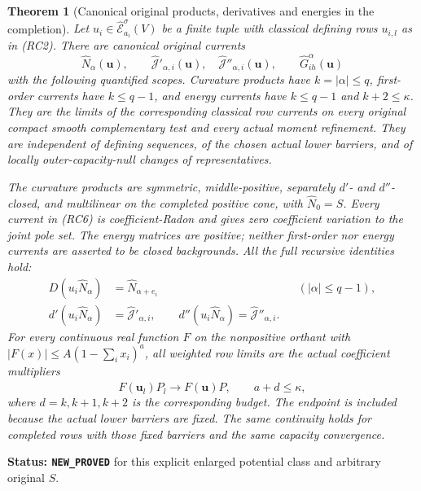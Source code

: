 \documentclass[11pt,a4paper]{article}
\numberwithin{equation}{section}
\newtheorem{theorem}{Theorem}[section]
\theoremstyle{definition}
\theoremstyle{remark}
\begin{document}
\begin{theorem}[Canonical original products, derivatives and energies in the completion]
\label{thm:r11-barrier-completed-calculus}
Let $u_i\in\widehat{\mathcal E}^{\sigma}_{a_i}(V)$ be a
finite tuple with classical defining rows $u_{i,l}$ as in
(RC2). There are canonical original currents
\[
 \widehat N_\alpha(\mathbf u),\qquad
 \widehat{\mathcal J}'_{\alpha,i}(\mathbf u),\quad
 \widehat{\mathcal J}''_{\alpha,i}(\mathbf u),\qquad
 \widehat G^\alpha_{ih}(\mathbf u)
 \tag{RC6}
\]
with the following quantified scopes. Curvature products have
$k=|\alpha|\leq q$, first-order currents have $k\leq q-1$,
and energy currents have $k\leq q-1$ and $k+2\leq\kappa$.
They are the limits of the corresponding classical row currents
on every original compact smooth complementary test and every
actual moment refinement. They are independent of defining
sequences, of the chosen actual lower barriers, and of locally
outer-capacity-null changes of representatives.

The curvature products are symmetric, middle-positive,
separately $d'$- and $d''$-closed, and multilinear on the
completed positive cone, with $\widehat N_0=S$.
Every current in (RC6) is coefficient-Radon and gives zero
coefficient variation to the joint pole set. The energy
matrices are positive; neither first-order nor energy
currents are asserted to be closed backgrounds.
All the full recursive identities hold:
\[
 \begin{aligned}
 D(u_i\widehat N_\alpha)&=\widehat N_{\alpha+e_i}
                                      &&(|\alpha|\leq q-1),\\
 d'(u_i\widehat N_\alpha)&=\widehat{\mathcal J}'_{\alpha,i},
       \qquad
 d''(u_i\widehat N_\alpha)=\widehat{\mathcal J}''_{\alpha,i}.
 \end{aligned}
 \tag{RC7}
\]
For every continuous real function $F$ on the nonpositive
orthant with $|F(x)|\leq A(1-\sum_i x_i)^a$, all weighted
row limits are the actual coefficient multipliers
\[
                F(\mathbf u_l)P_l\longrightarrow
                                      F(\mathbf u)\widehat P,
                 \qquad a+d\leq\kappa,
 \tag{RC8}
\]
where $d=k,k+1,k+2$ is the corresponding budget.
The endpoint is included because the actual lower barriers
are fixed. The same continuity holds for completed rows
with those fixed barriers and the same capacity convergence.
\end{theorem}

\noindent\textbf{Status: \texttt{NEW\_PROVED}} for this
explicit enlarged potential class and arbitrary original $S$.
\end{document}
